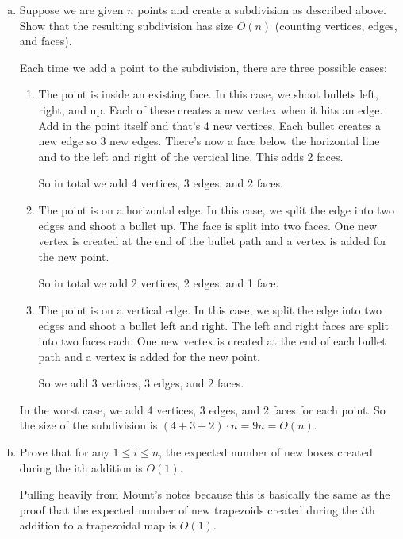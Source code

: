 \documentclass[11pt]{article}
\begin{document}
\begin{enumerate}[(a)]\itemsep0pt
  \item
    Suppose we are given \(n\) points and create a subdivision as described above. Show
    that the resulting subdivision has size \(O(n)\) (counting vertices, edges, and faces).
    
\begin{solution}
  Each time we add a point to the subdivision, there are three possible cases:
  \begin{enumerate}
    \item
      The point is inside an existing face. In this case, we shoot bullets left, right, and up. Each of these creates a new vertex when it hits an edge.
      Add in the point itself and that's 4 new vertices. Each bullet creates a new edge so 3 new edges. There's now a face below the horizontal line and
      to the left and right of the vertical line. This adds 2 faces.

      So in total we add 4 vertices, 3 edges, and 2 faces.
    \item
      The point is on a horizontal edge. In this case, we split the edge into two edges and shoot a bullet up. The face is split into two faces. One new vertex is created
      at the end of the bullet path and a vertex is added for the new point.

      So in total we add 2 vertices, 2 edges, and 1 face.
    \item
      The point is on a vertical edge. In this case, we split the edge into two edges and shoot a bullet left and right. The left and right faces are split into two faces each.
      One new vertex is created at the end of each bullet path and a vertex is added for the new point.

      So we add 3 vertices, 3 edges, and 2 faces.
  \end{enumerate}
  In the worst case, we add 4 vertices, 3 edges, and 2 faces for each point. So the size of the subdivision is \((4 + 3 + 2) \cdot n = 9n = O(n)\).
\end{solution}

  \item
    Prove that for any \(1 \leq i \leq n\), the expected
    number of new boxes created during the ith addition is \(O(1)\).

\begin{solution} Pulling heavily from Mount's notes because this is basically the same as the proof that the expected number of new trapezoids created during
  the \(i\)th addition to a trapezoidal map is \(O(1)\).


\end{solution}
\end{enumerate}
\end{document}
